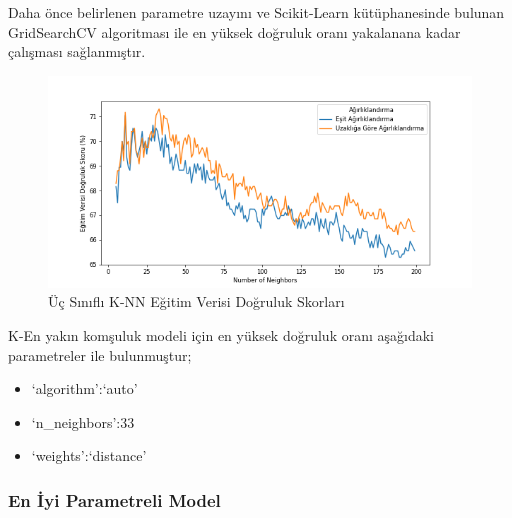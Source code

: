 \documentclass[12pt,twoside]{deuthesis}
\providecommand{\tightlist}{%
  \setlength{\itemsep}{0pt}\setlength{\parskip}{0pt}}
\begin{document}
Daha önce belirlenen parametre uzayını ve Scikit-Learn kütüphanesinde bulunan GridSearchCV algoritması ile en yüksek doğruluk oranı yakalanana kadar çalışması sağlanmıştır.
\begin{figure}

{\centering \includegraphics[width=1.1\linewidth,height=0.55\textheight]{figure/KNN_Grid_Graph} 

}

\caption{Üç Sınıflı K-NN Eğitim Verisi Doğruluk Skorları}\label{fig:unnamed-chunk-19}
\end{figure}
K-En yakın komşuluk modeli için en yüksek doğruluk oranı aşağıdaki parametreler ile bulunmuştur;
\begin{itemize}
\tightlist
\item
  `algorithm':`auto'
\item
  `n\_neighbors':33
\item
  `weights':`distance'
\end{itemize}
\newpage

\hypertarget{en-iyi-parametreli-model}{%
\subsubsection{En İyi Parametreli Model}\label{en-iyi-parametreli-model}}
\end{document}
